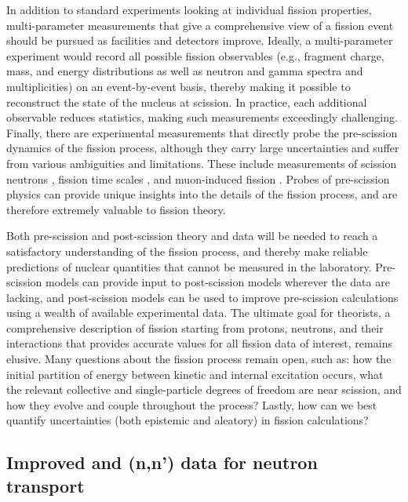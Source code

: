 \documentclass[letterpaper]{ar-1col}
\begin{document}
In addition to standard experiments looking at individual fission properties, multi-parameter measurements that give a comprehensive view of a fission event should be pursued as facilities and detectors improve.
Ideally, a multi-parameter experiment would record all possible fission observables (e.g., fragment charge, mass, and energy distributions as well as neutron and gamma spectra and multiplicities) on an event-by-event basis, thereby making it possible to reconstruct the state of the nucleus at scission.
In practice, each additional observable reduces statistics, making such measurements exceedingly challenging.
Finally, there are experimental measurements that directly probe the pre-scission dynamics of the fission process, although they carry large uncertainties and suffer from various ambiguities and limitations.
These include measurements of scission neutrons \cite{Petrov2009}, fission time scales \cite{Jac09}, and muon-induced fission \cite{Mar80}.
Probes of pre-scission physics can provide unique insights into the details of the fission process, and are therefore extremely valuable to fission theory.

Both pre-scission and post-scission theory and data will be needed to reach a satisfactory understanding of the fission process, and thereby make reliable predictions of nuclear quantities that cannot be measured in the laboratory.
Pre-scission models can provide input to post-scission models wherever the data are lacking, and post-scission models can be used to improve pre-scission calculations using a wealth of available experimental data.
The ultimate goal for theorists, a comprehensive description of fission starting from protons, neutrons, and their interactions that provides accurate values for all fission data of interest, remains elusive.
 Many questions about the fission process remain open, such as: how the initial partition of energy between kinetic and internal excitation occurs, what the relevant collective and single-particle degrees of freedom are near scission, and how they evolve and couple throughout the process? Lastly, how can we best quantify uncertainties (both epistemic and aleatory) in fission calculations?

\subsection{Improved \texorpdfstring{}{235,238U} and \texorpdfstring{}{239Pu}(n,n') data for neutron transport}\label{sec:n_transport}
\end{document}

